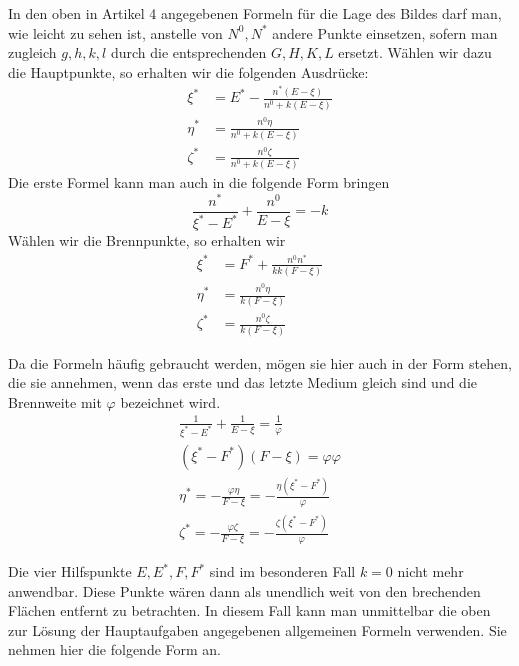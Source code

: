 In den oben in Artikel 4 angegebenen Formeln für die Lage des Bildes darf man, wie leicht zu sehen ist, anstelle von $N^0,N^*$ andere Punkte einsetzen, sofern man zugleich $g,h,k,l$ durch die entsprechenden $G,H,K,L$ ersetzt. Wählen wir dazu die Hauptpunkte, so erhalten wir die folgenden Ausdrücke:
\[
\begin{aligned}
\xi^*&=E^*-\frac{n^*(E-\xi)}{n^0+k(E-\xi)}\\
\eta^*&=\frac{n^0\eta}{n^0+k(E-\xi)}\\
\zeta^*&=\frac{n^0\zeta}{n^0+k(E-\xi)}
\end{aligned}
\]
Die erste Formel kann man auch in die folgende Form bringen
\[
\frac{n^*}{\xi^*-E^*}+\frac{n^0}{E-\xi}=-k
\]
Wählen wir die Brennpunkte, so erhalten wir
\[
\begin{aligned}
\xi^*&=F^*+\frac{n^0n^*}{kk(F-\xi)}\\
\eta^*&=\frac{n^0\eta}{k(F-\xi)}\\
\zeta^*&=\frac{n^0\zeta}{k(F-\xi)}
\end{aligned}
\]

Da die Formeln häufig gebraucht werden, mögen sie hier auch in der Form stehen, die sie annehmen, wenn das erste und das letzte Medium gleich sind und die Brennweite mit $\varphi$ bezeichnet wird.
\[
\begin{gathered}
\frac1{\xi^*-E^*}+\frac1{E-\xi}=\frac1\varphi\\
(\xi^*-F^*)(F-\xi)=\varphi\varphi\\
\eta^*=-\frac{\varphi\eta}{F-\xi}=-\frac{\eta(\xi^*-F^*)}{\varphi}\\
\zeta^*=-\frac{\varphi\zeta}{F-\xi}=-\frac{\zeta(\xi^*-F^*)}{\varphi}
\end{gathered}
\]

Die vier Hilfspunkte $E,E^*,F,F^*$ sind im besonderen Fall $k=0$ nicht mehr anwendbar. Diese Punkte wären dann als unendlich weit von den brechenden Flächen entfernt zu betrachten. In diesem Fall kann man unmittelbar die oben zur Lösung der Hauptaufgaben angegebenen allgemeinen Formeln verwenden. Sie nehmen hier die folgende Form an.

